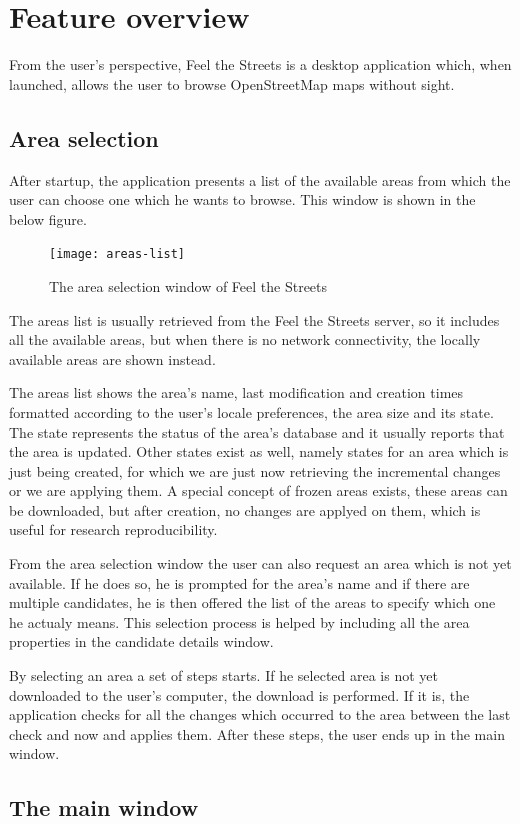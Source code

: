 \documentclass[nolof,digital]{fithesis3}
\begin{document}
\section{Feature overview}
From the user's perspective, Feel the Streets is a desktop application which, when launched, allows the user to browse OpenStreetMap maps without sight.
\subsection{Area selection}
After startup, the application presents a list of the available areas from which the user can choose one which he wants to browse. This window is shown in the below figure.
\begin{figure}[h]
\caption{The area selection window of Feel the Streets}
\texttt{[image: areas-list]}
\end{figure}
The areas list is usually retrieved from the Feel the Streets server, so it includes all the available areas, but when there is no network connectivity, the locally available areas are shown instead.

The areas list shows the area's name, last modification and creation times formatted according to the user's locale preferences, the area size and its state. The state represents the status of the area's database and it usually reports that the area is updated. Other states exist as well, namely states for an area which is just being created, for which we are just now retrieving the incremental changes or we are applying them. A special concept of frozen areas exists, these areas can be downloaded, but after creation, no changes are applyed on them, which is useful for research reproducibility.

From the area selection window the user can also request an area which is not yet available. If he does so, he is prompted for the area's name and if there are multiple candidates, he is then offered the list of the areas to specify which one he actualy means. This selection process is helped by including all the area properties in the candidate details window.

By selecting an area a set of steps starts. If he selected area is not yet downloaded to the user's computer, the download is performed. If it is, the application checks for all the changes which occurred to the area between the last check and now and applies them. After these steps, the user ends up in the main window.
\subsection{The main window}
\end{document}
